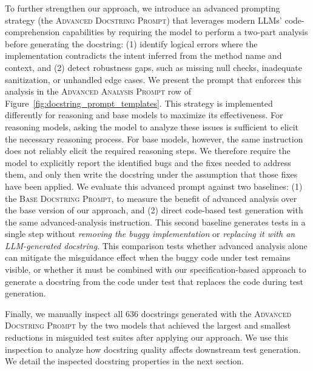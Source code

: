 \documentclass[acmsmall]{acmart}
\begin{document}
To further strengthen our approach, we introduce an advanced prompting strategy (the \textsc{Advanced Docstring Prompt}) that leverages modern LLMs' code-comprehension capabilities by requiring the model to perform a two-part analysis before generating the docstring: (1) identify logical errors where the implementation contradicts the intent inferred from the method name and context, and (2) detect robustness gaps, such as missing null checks, inadequate sanitization, or unhandled edge cases. We present the prompt that enforces this analysis in the \textsc{Advanced Analysis Prompt} row of Figure~\ref{fig:docstring_prompt_templates}. This strategy is implemented differently for reasoning and base models to maximize its effectiveness. For reasoning models, asking the model to analyze these issues is sufficient to elicit the necessary reasoning process. For base models, however, the same instruction does not reliably elicit the required reasoning steps. We therefore require the model to explicitly report the identified bugs and the fixes needed to address them, and only then write the docstring under the assumption that those fixes have been applied. We evaluate this advanced prompt against two baselines: (1) the \textsc{Base Docstring Prompt}, to measure the benefit of advanced analysis over the base version of our approach, and (2) direct code-based test generation with the same advanced-analysis instruction. This second baseline generates tests in a single step without \emph{removing the buggy implementation} or \emph{replacing it with an LLM-generated docstring}. This comparison tests whether advanced analysis alone can mitigate the misguidance effect when the buggy code under test remains visible, or whether it must be combined with our specification-based approach to generate a docstring from the code under test that replaces the code during test generation.

Finally, we manually inspect all 636 docstrings generated with the \textsc{Advanced Docstring Prompt} by the two models that achieved the largest and smallest reductions in misguided test suites after applying our approach. We use this inspection to analyze how docstring quality affects downstream test generation. We detail the inspected docstring properties in the next section.
\end{document}
